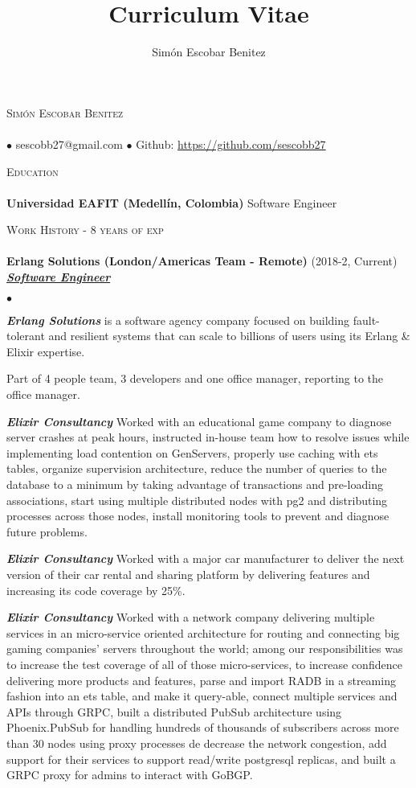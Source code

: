 \documentclass[a4paper]{article}
\title{Curriculum Vitae}
\author{Sim\'on Escobar Benitez}
\newcommand{\lineunder}{\vspace*{-8pt} \\ \hspace*{-18pt} \hrulefill \\}
\newcommand{\header}[1]{{\hspace*{-15pt}\vspace*{6pt}
  \textsc{#1}} \vspace*{-6pt} \lineunder}
\newcommand{\employer}[3]{{
  \textbf{#1} (#2)\\ \underline{\textbf{\emph{#3}}}\\ }}
\newcommand{\contact}[2]{
  \vspace*{-8pt}
  \begin{center}
  {\LARGE \scshape {#1}} \lineunder #2
  \end{center}
  \vspace*{-8pt} }
\newenvironment{achievements}{\begin{list}{$\bullet$}{\topsep 0pt \itemsep
  -2pt}}{\vspace*{4pt}\end{list}}
\newcommand{\schoolwithcourses}[2]{
  \textbf{#1} #2
  \vspace*{5pt} }
\newcommand{\emphasys}[1]{\textbf{\emph{#1}}}
\begin{document}
  \small
  \smallskip
  \vspace*{-44pt}
  \contact{Sim\'on Escobar Benitez} { $\bullet$ sescobb27@gmail.com $\bullet$ Github: \url{https://github.com/sescobb27} }
  \header{Education}
  \schoolwithcourses{Universidad EAFIT (Medell\'in, Colombia)}{Software Engineer}

  \header{Work History - 8 years of exp}

  \employer{ Erlang Solutions (London/Americas Team - Remote)}{2018-2, Current}{Software Engineer}
  \begin{achievements}
  \item \emphasys{Erlang Solutions} is a software agency company focused on building fault-tolerant and resilient systems that can scale to billions of users using its Erlang \& Elixir expertise.
  \item Part of 4 people team, 3 developers and one office manager, reporting to the office manager.
  \item \emphasys{Elixir Consultancy} Worked with an educational game company to diagnose server crashes at peak hours, instructed in-house team how to resolve issues while implementing load contention on GenServers, properly use caching with ets tables, organize supervision architecture, reduce the number of queries to the database to a minimum by taking advantage of transactions and pre-loading associations, start using multiple distributed nodes with pg2 and distributing processes across those nodes, install monitoring tools to prevent and diagnose future problems.
  \item \emphasys{Elixir Consultancy} Worked with a major car manufacturer to deliver the next version of their car rental and sharing platform by delivering features and increasing its code coverage by 25\%.
  \item \emphasys{Elixir Consultancy} Worked with a network company delivering multiple services in an micro-service oriented architecture for routing and connecting big gaming companies’ servers throughout the world; among our responsibilities was to increase the test coverage of all of those micro-services, to increase confidence delivering more products and features, parse and import RADB in a streaming fashion into an ets table, and make it query-able, connect multiple services and APIs through GRPC, built a distributed PubSub architecture using Phoenix.PubSub for handling hundreds of thousands of subscribers across more than 30 nodes using proxy processes de decrease the network congestion, add support for their services to support read/write postgresql replicas, and built a GRPC proxy for admins to interact with GoBGP.

\end{achievements}
\end{document}
